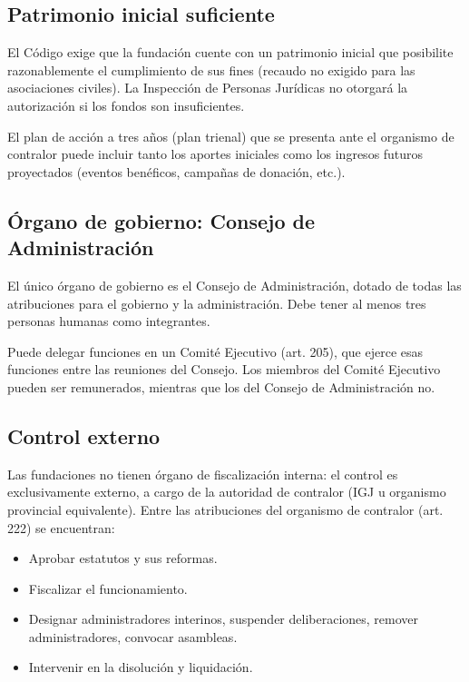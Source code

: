 \documentclass[12pt,oneside]{book}
\begin{document}
\subsection{Patrimonio inicial suficiente}

El Código exige que la fundación cuente con un patrimonio inicial que posibilite razonablemente el cumplimiento de sus fines (recaudo no exigido para las asociaciones civiles). La Inspección de Personas Jurídicas no otorgará la autorización si los fondos son insuficientes.

El plan de acción a tres años (plan trienal) que se presenta ante el organismo de contralor puede incluir tanto los aportes iniciales como los ingresos futuros proyectados (eventos benéficos, campañas de donación, etc.).

\subsection{Órgano de gobierno: Consejo de Administración}

El único órgano de gobierno es el Consejo de Administración, dotado de todas las atribuciones para el gobierno y la administración. Debe tener al menos tres personas humanas como integrantes.

Puede delegar funciones en un Comité Ejecutivo (art. 205), que ejerce esas funciones entre las reuniones del Consejo. Los miembros del Comité Ejecutivo pueden ser remunerados, mientras que los del Consejo de Administración no.

\subsection{Control externo}

Las fundaciones no tienen órgano de fiscalización interna: el control es exclusivamente externo, a cargo de la autoridad de contralor (IGJ u organismo provincial equivalente). Entre las atribuciones del organismo de contralor (art. 222) se encuentran:

\begin{itemize}
    \item Aprobar estatutos y sus reformas.
    \item Fiscalizar el funcionamiento.
    \item Designar administradores interinos, suspender deliberaciones, remover administradores, convocar asambleas.
    \item Intervenir en la disolución y liquidación.
\end{itemize}
\end{document}
